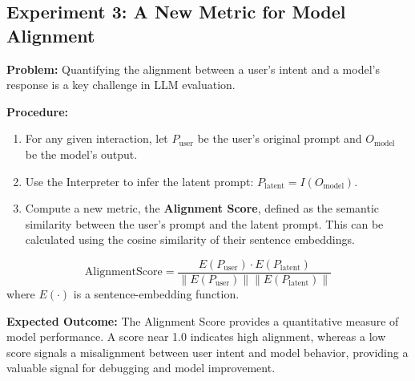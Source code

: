 \documentclass{article}
\begin{document}
\subsection{Experiment 3: A New Metric for Model Alignment}
\textbf{Problem:} Quantifying the alignment between a user's intent and a model's response is a key challenge in LLM evaluation.

\textbf{Procedure:}
\begin{enumerate}
    \item For any given interaction, let $P_{\text{user}}$ be the user's original prompt and $O_{\text{model}}$ be the model's output.
    \item Use the Interpreter to infer the latent prompt: $P_{\text{latent}} = I(O_{\text{model}})$.
    \item Compute a new metric, the \textbf{Alignment Score}, defined as the semantic similarity between the user's prompt and the latent prompt. This can be calculated using the cosine similarity of their sentence embeddings.
\end{enumerate}
\begin{equation}
    \text{AlignmentScore} = \frac{E(P_{\text{user}}) \cdot E(P_{\text{latent}})}{\|E(P_{\text{user}})\| \|E(P_{\text{latent}})\|}
\end{equation}
where $E(\cdot)$ is a sentence-embedding function.

\textbf{Expected Outcome:} The Alignment Score provides a quantitative measure of model performance. A score near 1.0 indicates high alignment, whereas a low score signals a misalignment between user intent and model behavior, providing a valuable signal for debugging and model improvement.
\end{document}
